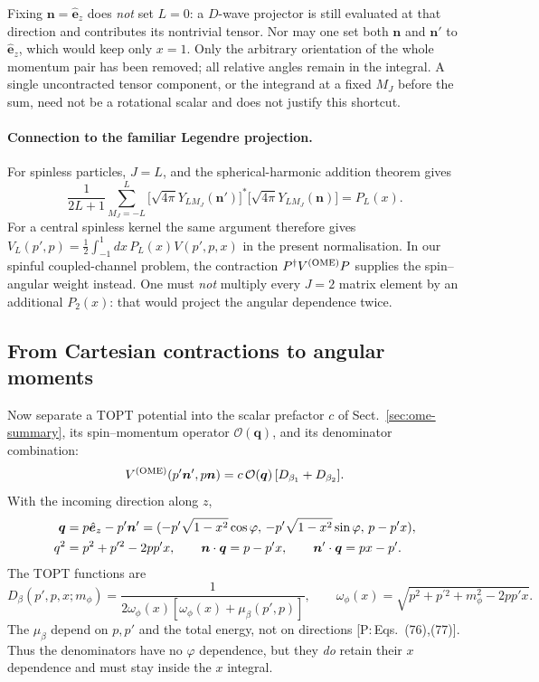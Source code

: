 \documentclass[11pt,a4paper]{article}
\newcommand{\tagP}[1]{\textcolor{blue!65!black}{\textsf{\small[P:\,#1]}}}
\newcommand{\VOME}{V^{\rm (OME)}}
\newcommand{\vq}{\bm q}
\newcommand{\vn}{\bm n}
\begin{document}
\begin{warnbox}
Fixing $\vn=\hat{\bm e}_z$ does \emph{not} set $L=0$: a $D$-wave projector is still evaluated at that direction and contributes its nontrivial tensor. Nor may one set both $\vn$ and $\vn'$ to $\hat{\bm e}_z$, which would keep only $x=1$. Only the arbitrary orientation of the whole momentum pair has been removed; all relative angles remain in the integral. A single uncontracted tensor component, or the integrand at a fixed $M_J$ before the sum, need not be a rotational scalar and does not justify this shortcut.
\end{warnbox}

\paragraph{Connection to the familiar Legendre projection.}
For spinless particles, $J=L$, and the spherical-harmonic addition theorem gives
\[
\frac1{2L+1}\sum_{M_J=-L}^{L}
\big[\sqrt{4\pi}Y_{L M_J}(\vn')\big]^*
\big[\sqrt{4\pi}Y_{L M_J}(\vn)\big]
=P_L(x).
\]
For a central spinless kernel the same argument therefore gives
$V_L(p',p)=\frac12\int_{-1}^{1}dx\,P_L(x)V(p',p,x)$ in the present normalisation. In our spinful coupled-channel problem, the contraction $P^\dagger\VOME P$ supplies the spin--angular weight instead. One must \emph{not} multiply every $J=2$ matrix element by an additional $P_2(x)$: that would project the angular dependence twice.

\subsection{From Cartesian contractions to angular moments}

Now separate a TOPT potential into the scalar prefactor $c$ of Sect.~\ref{sec:ome-summary}, its spin--momentum operator $\mathcal O(\vq)$, and its denominator combination:
\[
\VOME(p'\vn',p\vn)
=c\,\mathcal O(\vq)\,[D_{\beta_1}+D_{\beta_2}].
\]
With the incoming direction along $z$,
\begin{align}
\vq&=p\hat{\bm e}_z-p'\vn'
=(-p'\sqrt{1-x^2}\cos\varphi,\,
-p'\sqrt{1-x^2}\sin\varphi,\,p-p'x),\notag\\
q^2&=p^2+p^{\prime2}-2pp'x,\qquad
\vn\cdot\vq=p-p'x,\qquad
\vn'\cdot\vq=px-p'.
\label{eq:pw-kinematics}
\end{align}
The TOPT functions are
\[
D_\beta(p',p,x;m_\phi)
=\frac1{2\omega_\phi(x)[\omega_\phi(x)+\mu_\beta(p',p)]},
\qquad
\omega_\phi(x)=\sqrt{p^2+p^{\prime2}+m_\phi^2-2pp'x}.
\]
The $\mu_\beta$ depend on $p,p'$ and the total energy, not on directions \tagP{Eqs.~(76),(77)}. Thus the denominators have no $\varphi$ dependence, but they \emph{do} retain their $x$ dependence and must stay inside the $x$ integral.
\end{document}
